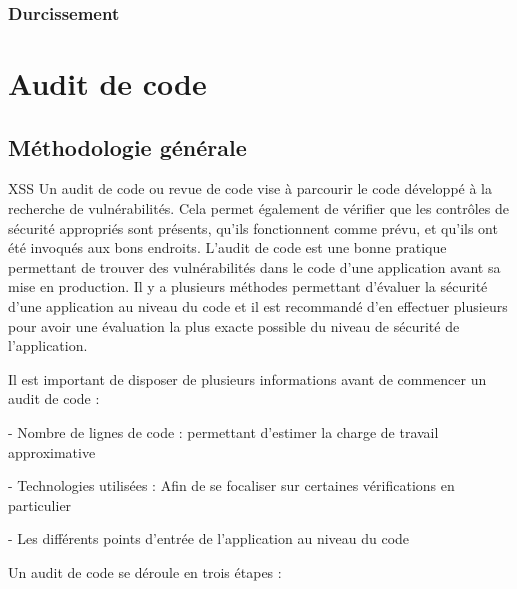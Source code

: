 \documentclass[twoside,a4paper,12pt,titlepage]{book}
\begin{document}
\subsection{Durcissement}

\chapter{Audit de code}
\section{Méthodologie générale}

\begin{Define}{XSS}
Un audit de code ou revue de code vise à parcourir le code développé à la recherche de vulnérabilités. Cela permet également de vérifier que les contrôles de sécurité appropriés
sont présents, qu'ils fonctionnent comme prévu, et qu'ils ont été invoqués aux bons endroits.
L’audit de code est une bonne pratique permettant de trouver des vulnérabilités dans le code d’une application avant sa mise en production. Il y a plusieurs méthodes permettant d’évaluer la sécurité d’une application au niveau du code et il est recommandé d’en effectuer plusieurs pour avoir une évaluation la plus exacte possible du niveau de sécurité de l’application.
\end{Define}
\begin{Pre}
Il est important de disposer de plusieurs informations avant de commencer un audit de code :
\item - Nombre de lignes de code : permettant d’estimer la charge de travail approximative
\item - Technologies utilisées : Afin de se focaliser sur certaines vérifications en particulier
\item - Les différents points d’entrée de l’application au niveau du code
\end{Pre}
Un audit de code se déroule en trois étapes :
\end{document}
